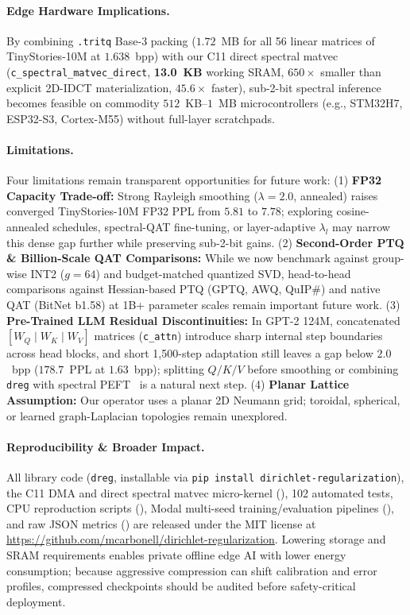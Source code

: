 \documentclass[11pt,a4paper]{article}
\begin{document}
\paragraph{Edge Hardware Implications.}
By combining \texttt{.tritq} Base-3 packing ($1.72$~MB for all 56 linear matrices of TinyStories-10M at $1.638$~bpp) with our C11 direct spectral matvec (\texttt{c\_spectral\_matvec\_direct}, \textbf{13.0~KB} working SRAM, $650\times$ smaller than explicit 2D-IDCT materialization, $45.6\times$ faster), sub-2-bit spectral inference becomes feasible on commodity $512$~KB--$1$~MB microcontrollers (e.g., STM32H7, ESP32-S3, Cortex-M55) without full-layer scratchpads.

\paragraph{Limitations.}
Four limitations remain transparent opportunities for future work:
(1) \textbf{FP32 Capacity Trade-off:} Strong Rayleigh smoothing ($\lambda = 2.0$, annealed) raises converged TinyStories-10M FP32 PPL from $5.81$ to $7.78$; exploring cosine-annealed schedules, spectral-QAT fine-tuning, or layer-adaptive $\lambda_l$ may narrow this dense gap further while preserving sub-2-bit gains.
(2) \textbf{Second-Order PTQ & Billion-Scale QAT Comparisons:} While we now benchmark against group-wise INT2 ($g=64$) and budget-matched quantized SVD, head-to-head comparisons against Hessian-based PTQ (GPTQ, AWQ, QuIP\#) and native QAT (BitNet b1.58) at 1B+ parameter scales remain important future work.
(3) \textbf{Pre-Trained LLM Residual Discontinuities:} In GPT-2 124M, concatenated $[W_Q \mid W_K \mid W_V]$ matrices (\texttt{c\_attn}) introduce sharp internal step boundaries across head blocks, and short 1,500-step adaptation still leaves a gap below $2.0$~bpp ($178.7$~PPL at $1.63$~bpp); splitting $Q/K/V$ before smoothing or combining \texttt{dreg} with spectral PEFT~\citep{gao2024fourierft} is a natural next step.
(4) \textbf{Planar Lattice Assumption:} Our operator uses a planar 2D Neumann grid; toroidal, spherical, or learned graph-Laplacian topologies remain unexplored.

\paragraph{Reproducibility \& Broader Impact.}
All library code (\texttt{dreg}, installable via \texttt{pip install dirichlet-regularization}), the C11 DMA and direct spectral matvec micro-kernel (), 102 automated tests, CPU reproduction scripts (), Modal multi-seed training/evaluation pipelines (), and raw JSON metrics () are released under the MIT license at \url{https://github.com/mcarbonell/dirichlet-regularization}. Lowering storage and SRAM requirements enables private offline edge AI with lower energy consumption; because aggressive compression can shift calibration and error profiles, compressed checkpoints should be audited before safety-critical deployment.
\end{document}
